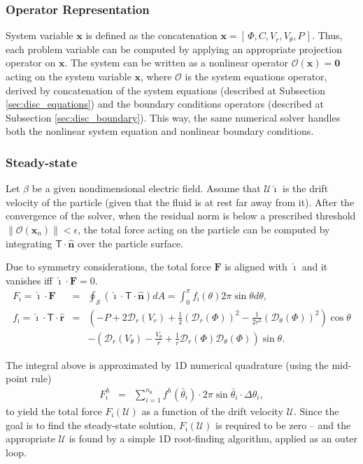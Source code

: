 \documentclass[10pt]{ijnam}
\newcommand{\pars}[1]{\left(#1\right)}
\newcommand\bn{\boldsymbol{\hat{n}}}
\newcommand\bF{\boldsymbol{F}}
\newcommand\bx{\boldsymbol{x}}
\newcommand\br{\boldsymbol{r}}
\newcommand\brhat{\hat{\br}}
\newcommand\bnhat{\hat{\boldsymbol{n}}}
\newcommand\bzero{\boldsymbol{0}}
\newcommand\cO{\mathcal{O}}
\newcommand\cD{\mathcal{D}}
\newcommand\cU{\mathscr{U}}
\newcommand\tT{\mathsf{T}}
\newcommand\ui{\boldsymbol{\hat{\imath}}}
\begin{document}
\subsubsection{Operator Representation}
System variable $\bx$ is defined as the concatenation $\bx = [\,\varPhi, C, V_r, V_\theta, P\,]$.
Thus, each problem variable can be computed by applying an appropriate projection operator on $\bx$.
The system can be written as a nonlinear operator $\cO(\bx) = \bzero$ 
acting on the system variable ${\bx}$, 
where $\cO$ is the system equations operator, 
derived by concatenation of the system equations (described at Subsection \ref{sec:disc_equations})
and the boundary conditions operators (described at Subsection \ref{sec:disc_boundary}).
This way, the same numerical solver handles both the nonlinear system equation and nonlinear
boundary conditions.

\subsubsection{Steady-state}
Let $\beta$ be a given nondimensional electric field.
Assume that $\cU \ui$ is the drift velocity of the particle 
(given that the fluid is at rest far away from it).
After the convergence of the solver, when the residual norm is below
a prescribed threshold $\|\cO(\bx_n)\| < \epsilon$, 
the total force acting on the particle  
can be computed by integrating $\tT \cdot \bn$ over the particle surface.

Due to symmetry considerations, the total force $\bF$ is 
aligned with $\ui$ and it vanishes iff $\ui \cdot \bF = 0$.
\begin{eqnarray} \nonumber
F_\imath = \ui \cdot \bF &=& 
\oint_\mathcal{S} \pars{\ui \cdot \tT \cdot \bnhat} dA = 
\int_0^\pi f_\imath(\theta) 2\pi \sin\theta d\theta ,
\\  
f_\imath = \ui \cdot \tT \cdot \brhat &=& \pars{-P + 2\cD_r(V_r) + 
\frac{1}{2}\pars{\cD_r(\varPhi)}^2 - \frac{1}{2r^2}\pars{\cD_\theta(\varPhi)}^2}\cos\theta 
\\  \nonumber
&& -\pars{\cD_r(V_\theta) - \frac{V_\theta}{r}
+ \frac{1}{r}\cD_r(\varPhi) \cD_{\theta}(\varPhi)}\sin\theta.
\end{eqnarray}

The integral above is approximated by 1D numerical quadrature
(using the mid-point rule)
\begin{eqnarray*}
F_\imath^h &=& \sum_{i=1}^{n_\theta} f^h(\bar\theta_i) \cdot 
              2 \pi \sin\bar\theta_i \cdot \Delta\theta_i,
\end{eqnarray*}
to yield 
the total force $F_\imath(\cU)$ as a function of the drift velocity $\cU$.
Since the goal is to find the steady-state solution, $F_\imath(\cU)$ 
is required to be zero --
and the appropriate $\cU$ is found by a simple 1D root-finding algorithm,
applied as an outer loop.
\end{document}
